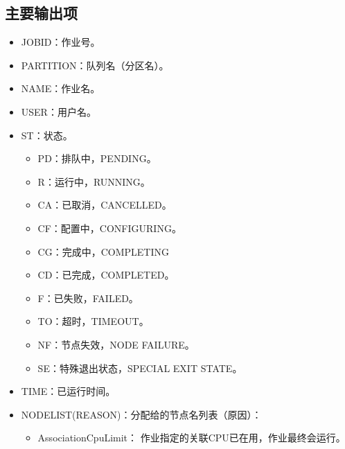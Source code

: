 \documentclass[a4paper,12pt,english]{sphinxmanual}
\begin{document}
\subsection{主要输出项}
\label{\detokenize{slurm/slurm:id9}}\label{\detokenize{slurm/slurm:id10}}\begin{itemize}
\item {} 
\sphinxAtStartPar
JOBID：作业号。

\item {} 
\sphinxAtStartPar
PARTITION：队列名（分区名）。

\item {} 
\sphinxAtStartPar
NAME：作业名。

\item {} 
\sphinxAtStartPar
USER：用户名。

\item {} 
\sphinxAtStartPar
ST：状态。
\begin{itemize}
\item {} 
\sphinxAtStartPar
PD：排队中，PENDING。

\item {} 
\sphinxAtStartPar
R：运行中，RUNNING。

\item {} 
\sphinxAtStartPar
CA：已取消，CANCELLED。

\item {} 
\sphinxAtStartPar
CF：配置中，CONFIGURING。

\item {} 
\sphinxAtStartPar
CG：完成中，COMPLETING

\item {} 
\sphinxAtStartPar
CD：已完成，COMPLETED。

\item {} 
\sphinxAtStartPar
F：已失败，FAILED。

\item {} 
\sphinxAtStartPar
TO：超时，TIMEOUT。

\item {} 
\sphinxAtStartPar
NF：节点失效，NODE FAILURE。

\item {} 
\sphinxAtStartPar
SE：特殊退出状态，SPECIAL EXIT STATE。

\end{itemize}

\item {} 
\sphinxAtStartPar
TIME：已运行时间。

\item {} 
\sphinxAtStartPar
NODELIST(REASON)：分配给的节点名列表（原因）：
\begin{itemize}
\item {} 
\sphinxAtStartPar
AssociationCpuLimit： 作业指定的关联CPU已在用，作业最终会运行。


\end{itemize}
\end{itemize}
\end{document}
